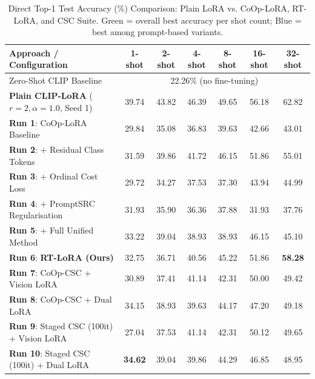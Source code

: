 \documentclass[letterpaper,11pt,leqno]{article}
\begin{document}
\begin{table}[H]
\centering
\caption{Direct Top-1 Test Accuracy (\%) Comparison: Plain LoRA vs. CoOp-LoRA, RT-LoRA, and CSC Suite.
\colorbox{bestgreen}{Green} = overall best accuracy per shot count;
\colorbox{sectionblue}{Blue} = best among prompt-based variants.}
\small
\begin{tabular}{lcccccc}
\toprule
\textbf{Approach / Configuration} & \textbf{1-shot} & \textbf{2-shot} & \textbf{4-shot}
                                  & \textbf{8-shot} & \textbf{16-shot} & \textbf{32-shot} \\
\midrule
Zero-Shot CLIP Baseline & \multicolumn{6}{c}{22.26\% (no fine-tuning)} \\
\midrule
\textbf{Plain CLIP-LoRA} ($r{=}2, \alpha{=}1.0$, Seed 1)
  & \cellcolor{bestgreen}39.74 & \cellcolor{bestgreen}43.82 & \cellcolor{bestgreen}46.39
  & \cellcolor{bestgreen}49.65 & \cellcolor{bestgreen}56.18 & \cellcolor{bestgreen}62.82 \\
\midrule
\textbf{Run 1}: CoOp-LoRA Baseline
  & 29.84 & 35.08 & 36.83 & 39.63 & 42.66 & 43.01 \\
\textbf{Run 2}: + Residual Class Tokens
  & 31.59 & \cellcolor{sectionblue}39.86 & \cellcolor{sectionblue}41.72
  & \cellcolor{sectionblue}46.15 & \cellcolor{sectionblue}51.86 & 55.01 \\
\textbf{Run 3}: + Ordinal Cost Loss
  & 29.72 & 34.27 & 37.53 & 37.30 & 43.94 & 44.99 \\
\textbf{Run 4}: + PromptSRC Regularisation
  & 31.93 & 35.90 & 36.36 & 37.88
  & \cellcolor{worstred}31.93 & 37.76 \\
\textbf{Run 5}: + Full Unified Method
  & 33.22 & 39.04 & 38.93 & 38.93
  & 46.15 & 45.10 \\
\textbf{Run 6}: \textbf{RT-LoRA (Ours)}
  & 32.75 & 36.71 & 40.56 & 45.22
  & \cellcolor{sectionblue}51.86 & \cellcolor{sectionblue}\textbf{58.28} \\
\textbf{Run 7}: CoOp-CSC + Vision LoRA
  & 30.89 & 37.41 & 41.14 & 42.31 & 50.00 & 49.42 \\
\textbf{Run 8}: CoOp-CSC + Dual LoRA
  & 34.15 & 38.93 & 39.63 & 44.17 & 47.20 & 49.18 \\
\textbf{Run 9}: Staged CSC (100it) + Vision LoRA
  & 27.04 & 37.53 & 41.14 & 42.31 & 50.12 & 49.65 \\
\textbf{Run 10}: Staged CSC (100it) + Dual LoRA
  & \cellcolor{sectionblue}\textbf{34.62} & 39.04 & 39.86 & 44.29 & 46.85 & 48.95 \\
\bottomrule
\end{tabular}
\label{tab:plain_vs_coop}
\end{table}
\end{document}
